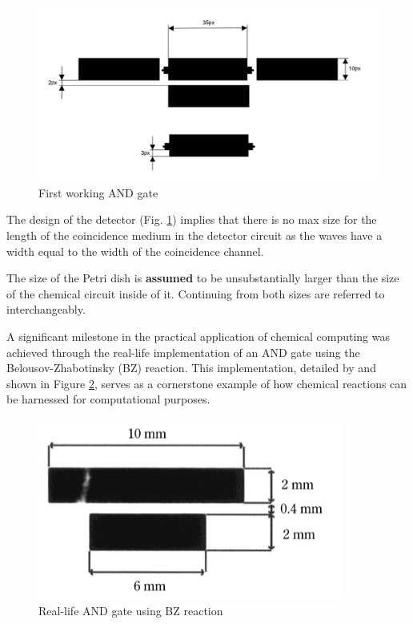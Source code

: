 \begin{figure}
    \centering
    \includegraphics[width=1\linewidth]{measurement-and.jpg}
    \caption{First working AND gate}
    \label{fig:and-gate}
\end{figure}

The design of the detector (Fig. \ref{fig:and-gate}) implies that there is no max size for the length of the coincidence medium in the detector circuit as the waves have a width equal to the width of the coincidence channel.
\begin{tcolorbox}[colback=red!5!white,colframe=red!75!black,title=Assumption]
    The size of the Petri dish is \textbf{assumed} to be unsubstantially larger than the size of the chemical circuit inside of it. Continuing from both sizes are referred to interchangeably.
\end{tcolorbox}
A significant milestone in the practical application of chemical computing was achieved through the real-life implementation of an AND gate using the Belousov-Zhabotinsky (BZ) reaction. This implementation, detailed by \cite{gorecki2003chemical} and shown in Figure \ref{fig:bz-and-gate}, serves as a cornerstone example of how chemical reactions can be harnessed for computational purposes.

\begin{figure}
    \centering
    \includegraphics[width=0.6\linewidth]{images/Screenshot 2024-03-10 at 20.59.51.png}
    \caption{Real-life AND gate using BZ reaction \citep{gorecki2003chemical}}
    \label{fig:bz-and-gate}
\end{figure}


